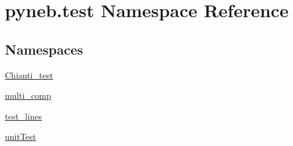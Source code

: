 \hypertarget{namespacepyneb_1_1test}{}\section{pyneb.\+test Namespace Reference}
\label{namespacepyneb_1_1test}
\subsection*{Namespaces}
\begin{DoxyCompactItemize}
\item 
 \hyperlink{namespacepyneb_1_1test_1_1_chianti__test}{Chianti\+\_\+test}
\item 
 \hyperlink{namespacepyneb_1_1test_1_1multi__comp}{multi\+\_\+comp}
\item 
 \hyperlink{namespacepyneb_1_1test_1_1test__lines}{test\+\_\+lines}
\item 
 \hyperlink{namespacepyneb_1_1test_1_1unit_test}{unit\+Test}
\end{DoxyCompactItemize}
